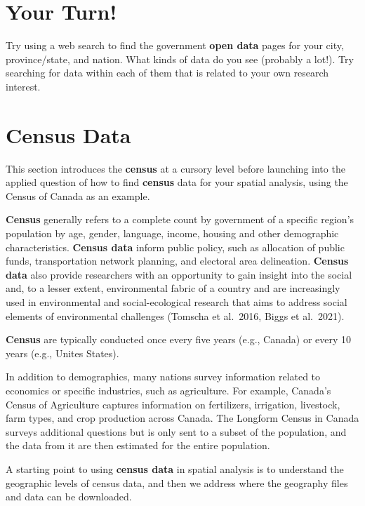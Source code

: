 \documentclass[
]{book}
\begin{document}
\hypertarget{your-turn-1}{%
\section*{Your Turn!}\label{your-turn-1}}

Try using a web search to find the government \textbf{open data} pages for your city, province/state, and nation. What kinds of data do you see (probably a lot!). Try searching for data within each of them that is related to your own research interest.

\hypertarget{census-data}{%
\section{Census Data}\label{census-data}}

This section introduces the \textbf{census} at a cursory level before launching into the applied question of how to find \textbf{census} data for your spatial analysis, using the Census of Canada as an example.

\textbf{Census} generally refers to a complete count by government of a specific region's population by age, gender, language, income, housing and other demographic characteristics. \textbf{Census data} inform public policy, such as allocation of public funds, transportation network planning, and electoral area delineation. \textbf{Census data} also provide researchers with an opportunity to gain insight into the social and, to a lesser extent, environmental fabric of a country and are increasingly used in environmental and social-ecological research that aims to address social elements of environmental challenges (Tomscha et al.~2016, Biggs et al.~2021).

\textbf{Census} are typically conducted once every five years (e.g., Canada) or every 10 years (e.g., Unites States).

In addition to demographics, many nations survey information related to economics or specific industries, such as agriculture. For example, Canada's Census of Agriculture captures information on fertilizers, irrigation, livestock, farm types, and crop production across Canada. The Longform Census in Canada surveys additional questions but is only sent to a subset of the population, and the data from it are then estimated for the entire population.

A starting point to using \textbf{census data} in spatial analysis is to understand the geographic levels of census data, and then we address where the geography files and data can be downloaded.
\end{document}
